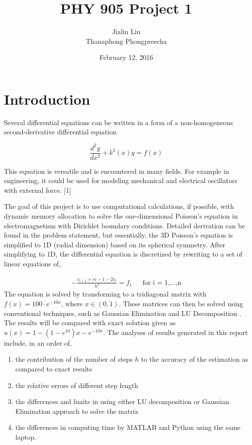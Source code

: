 \documentclass{article}
\begin{document}
\lstset{language=Pascal}          %

\newpage

	\title{PHY 905 Project 1}
	\author{Jialin Liu \\ Thanaphong Phongpreecha}
	\date{February 12, 2016}
	\maketitle
	
	\newpage
	
	\section{Introduction}
	Several differential equations can be written in a form of a non-homogeneous second-derivative differential equation 
	
	\begin{equation*}	
	\frac{d^{2}y}{dx^2} + k^2(x)y=f(x)
	\end{equation*}
	
	This equation is versatile and is encountered in many fields. For example in engineering, it could be used for modeling mechanical and electrical oscillators with external force. [1]
	
	The goal of this project is to use computational calculations, if possible, with dynamic memory allocation to solve the one-dimensional Poisson's equation in electromagnetism with Dirichlet boundary conditions. Detailed derivation can be found in the problem statement, but essentially, the 3D Poisson's equation is simplified to 1D (radial dimension) based on its spherical symmetry. After simplifying to 1D, the differential equation is discretized by rewriting to a set of linear equations of,
	
	\begin{align*}
	-\frac{v_{i+1}+v{i-1}-2v_i}{h^2}=f_i && \text{for i = 1,...,n}
	\end{align*}
	The equation is solved by transforming to a tridiagonal matrix with $f(x)=100 \cdot e^{-10x}$, where $x \in (0,1) $. These matrices can then be solved using conventional techniques, such as Gaussian Elimination and LU Decomposition \cite{rice2012applied}. The results will be compared with exact solution given as $u(x)=1-(1-e^{10})x-e^{-10x}$. The analyses of results generated in this report include, in an order of,
	
	\begin{enumerate}
		\item the contribution of the number of steps $h$ to the accuracy of the estimation as compared to exact results 
		\item the relative errors of different step length 
		\item the differences and limits in using either LU decomposition or Gaussian Elimination approach to solve the matrix
		\item the differences in computing time by MATLAB and Python using the same laptop.
	\end{enumerate}
	
\end{document}
